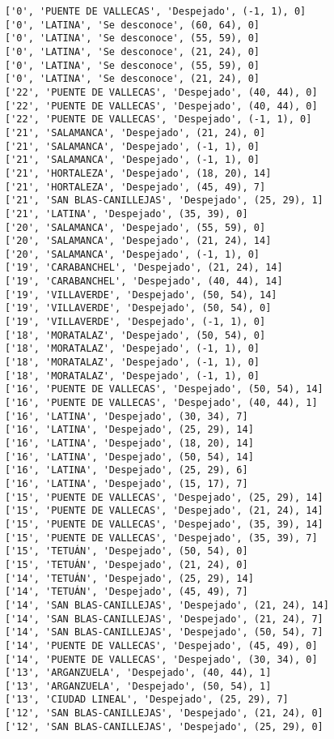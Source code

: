 \documentclass[11pt]{article}
\begin{document}
\begin{Verbatim}[commandchars=\\\{\}]
['0', 'PUENTE DE VALLECAS', 'Despejado', (-1, 1), 0]
['0', 'LATINA', 'Se desconoce', (60, 64), 0]
['0', 'LATINA', 'Se desconoce', (55, 59), 0]
['0', 'LATINA', 'Se desconoce', (21, 24), 0]
['0', 'LATINA', 'Se desconoce', (55, 59), 0]
['0', 'LATINA', 'Se desconoce', (21, 24), 0]
['22', 'PUENTE DE VALLECAS', 'Despejado', (40, 44), 0]
['22', 'PUENTE DE VALLECAS', 'Despejado', (40, 44), 0]
['22', 'PUENTE DE VALLECAS', 'Despejado', (-1, 1), 0]
['21', 'SALAMANCA', 'Despejado', (21, 24), 0]
['21', 'SALAMANCA', 'Despejado', (-1, 1), 0]
['21', 'SALAMANCA', 'Despejado', (-1, 1), 0]
['21', 'HORTALEZA', 'Despejado', (18, 20), 14]
['21', 'HORTALEZA', 'Despejado', (45, 49), 7]
['21', 'SAN BLAS-CANILLEJAS', 'Despejado', (25, 29), 1]
['21', 'LATINA', 'Despejado', (35, 39), 0]
['20', 'SALAMANCA', 'Despejado', (55, 59), 0]
['20', 'SALAMANCA', 'Despejado', (21, 24), 14]
['20', 'SALAMANCA', 'Despejado', (-1, 1), 0]
['19', 'CARABANCHEL', 'Despejado', (21, 24), 14]
['19', 'CARABANCHEL', 'Despejado', (40, 44), 14]
['19', 'VILLAVERDE', 'Despejado', (50, 54), 14]
['19', 'VILLAVERDE', 'Despejado', (50, 54), 0]
['19', 'VILLAVERDE', 'Despejado', (-1, 1), 0]
['18', 'MORATALAZ', 'Despejado', (50, 54), 0]
['18', 'MORATALAZ', 'Despejado', (-1, 1), 0]
['18', 'MORATALAZ', 'Despejado', (-1, 1), 0]
['18', 'MORATALAZ', 'Despejado', (-1, 1), 0]
['16', 'PUENTE DE VALLECAS', 'Despejado', (50, 54), 14]
['16', 'PUENTE DE VALLECAS', 'Despejado', (40, 44), 1]
['16', 'LATINA', 'Despejado', (30, 34), 7]
['16', 'LATINA', 'Despejado', (25, 29), 14]
['16', 'LATINA', 'Despejado', (18, 20), 14]
['16', 'LATINA', 'Despejado', (50, 54), 14]
['16', 'LATINA', 'Despejado', (25, 29), 6]
['16', 'LATINA', 'Despejado', (15, 17), 7]
['15', 'PUENTE DE VALLECAS', 'Despejado', (25, 29), 14]
['15', 'PUENTE DE VALLECAS', 'Despejado', (21, 24), 14]
['15', 'PUENTE DE VALLECAS', 'Despejado', (35, 39), 14]
['15', 'PUENTE DE VALLECAS', 'Despejado', (35, 39), 7]
['15', 'TETUÁN', 'Despejado', (50, 54), 0]
['15', 'TETUÁN', 'Despejado', (21, 24), 0]
['14', 'TETUÁN', 'Despejado', (25, 29), 14]
['14', 'TETUÁN', 'Despejado', (45, 49), 7]
['14', 'SAN BLAS-CANILLEJAS', 'Despejado', (21, 24), 14]
['14', 'SAN BLAS-CANILLEJAS', 'Despejado', (21, 24), 7]
['14', 'SAN BLAS-CANILLEJAS', 'Despejado', (50, 54), 7]
['14', 'PUENTE DE VALLECAS', 'Despejado', (45, 49), 0]
['14', 'PUENTE DE VALLECAS', 'Despejado', (30, 34), 0]
['13', 'ARGANZUELA', 'Despejado', (40, 44), 1]
['13', 'ARGANZUELA', 'Despejado', (50, 54), 1]
['13', 'CIUDAD LINEAL', 'Despejado', (25, 29), 7]
['12', 'SAN BLAS-CANILLEJAS', 'Despejado', (21, 24), 0]
['12', 'SAN BLAS-CANILLEJAS', 'Despejado', (25, 29), 0]

\end{Verbatim}
\end{document}
